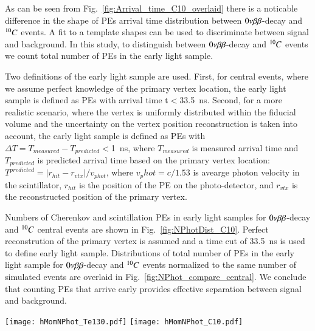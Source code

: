 As can be seen from Fig.~\ref{fig:Arrival_time_C10_overlaid} there is a noticable difference
in the shape of PEs arrival time distribution between $0\nu\beta\beta$-decay and $^{10}C$ events. A fit
to a template shapes can be used to discriminate between signal and background. In this study,
to distinguish between $0\nu\beta\beta$-decay and $^{10}C$ events we count total number of PEs in the
early light sample. 

Two definitions of the early light sample are used. First, for central events, where we assume 
perfect knowledge of the primary vertex location, the early light sample is defined as PEs 
with arrival time t$<$33.5~ns. Second, for a more realistic scenario, where the vertex is uniformly 
distributed within the fiducial volume and the uncertainty on the vertex position reconstruction
is taken into account, the early light sample is defined as PEs with $\Delta T=T_{measured} - 
T_{predicted}<$1~ns, where $T_{measured}$ is measured arrival time and $T_{predicted}$
is predicted arrival time based on the primary vertex location: 
$T^{predicted} = |r_{hit} - r_{vtx}|/v_{phot}$, where $v_phot = c/1.53$ is avearge photon velocity
in the scintillator, $r_{hit}$ is the position of the PE on the photo-detector, and $r_{vtx}$ is the
reconstructed position of the primary vertex.


Numbers of Cherenkov and scintillation PEs in early light samples for $0\nu\beta\beta$-decay and 
$^{10}C$ central events are shown in Fig.~\ref{fig:NPhotDist_C10}. Perfect reconstrution of the 
primary vertex is assumed and a time cut of 33.5~ns is used to define early light sample. 
Distributions of total number of PEs in the early light sample for $0\nu\beta\beta$-decay and $^{10}C$ events
normalized to the same number of simulated events are overlaid in Fig.~\ref{fig:NPhot_compare_central}.
We conclude that counting PEs that arrive early provides effective separation between signal and
background.


\begin{figure*}[ht]
  \centering
  \texttt{[image: hMomNPhot\_Te130.pdf]}
  \texttt{[image: hMomNPhot\_C10.pdf]}
  \caption{Number of PEs after 33.5~ns time cut applied to events simulated at the center
    of the detector. Cherenkov (\emph{dashed red line}), 
    scintillation (\emph{dotted blue line}), and total (\emph{solid black line}) PEs are
    compared separately for the simulation of 1000 $^{130}$Te 0{\nbb} decay (left panel)
    and of 4152 $^{10}$C (\emph{right panel}) events.} 
\label{fig:NPhotDist_C10}
\end{figure*}



